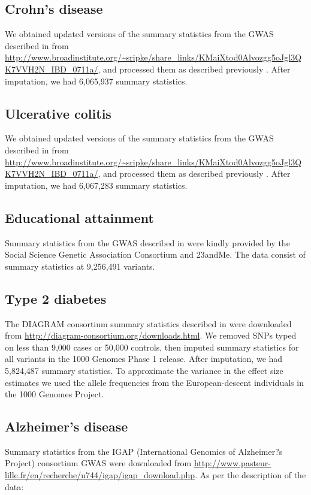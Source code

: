 \documentclass[11pt,titlepage]{article}
\begin{document}
\subsection{Crohn's disease}
We obtained updated versions of the summary statistics from the GWAS described in \citet{jostins2012host} from \url{http://www.broadinstitute.org/~sripke/share_links/KMaiXtod0Alvozgg5oJgl3QK7VVH2N_IBD_0711a/}, and processed them as described previously \citep{pickrell2013joint}.  After imputation, we had 6,065,937 summary statistics.

\subsection{Ulcerative colitis}
We obtained updated versions of the summary statistics from the GWAS described in \citet{jostins2012host} from \url{http://www.broadinstitute.org/~sripke/share_links/KMaiXtod0Alvozgg5oJgl3QK7VVH2N_IBD_0711a/}, and processed them as described previously \citep{pickrell2013joint}.  After imputation, we had 6,067,283 summary statistics.

\subsection{Educational attainment}
Summary statistics from the GWAS described in \citet{okbay} were kindly provided by the Social Science Genetic Association Consortium and 23andMe. The data consist of summary statistics at 9,256,491 variants. 

\subsection{Type 2 diabetes}
The DIAGRAM consortium summary statistics described in \citep{Morris:2012aa} were downloaded from \url{http://diagram-consortium.org/downloads.html}. We removed SNPs typed on less than 9,000 cases or 50,000 controls, then imputed summary statistics for all variants in the 1000 Genomes Phase 1 release. After imputation, we had 5,824,487 summary statistics. To approximate the variance in the effect size estimates we used the allele frequencies from the European-descent individuals in the 1000 Genomes Project. 

\subsection{Alzheimer's disease}
Summary statistics from the IGAP (International Genomics of Alzheimer?s Project) consortium GWAS \citep{Lambert:2013aa} were downloaded from \url{http://www.pasteur-lille.fr/en/recherche/u744/igap/igap_download.php}. As per the description of the data:
\end{document}
